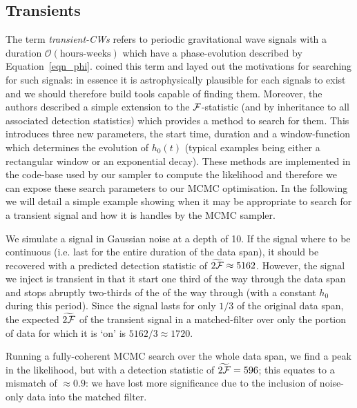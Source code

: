 \documentclass[aps, prd, twocolumn, superscriptaddress, floatfix, showpacs, nofootinbib, longbibliography]{revtex4-1}
\begin{document}
\subsection{Transients}
\label{sec_transients}

The term \emph{transient-CWs} refers to periodic gravitational wave signals
with a duration $\mathcal{O}(\textrm{hours-weeks})$ which have a
phase-evolution described by Equation~\eqref{eqn_phi}. \citet{prix2011} coined
this term and layed out the motivations for searching for such signals: in
essence it is astrophysically plausible for each signals to exist and we should
therefore build tools capable of finding them. Moreover, the authors described
a simple extension to the ${\mathcal{F}}$-statistic (and by inheritance to all associated
detection statistics) which provides a method to search for them. This
introduces three new parameters, the start time, duration and a window-function
which determines the evolution of $h_0(t)$ (typical examples being either a
rectangular window or an exponential decay). These methods are implemented in
the code-base used by our sampler to compute the likelihood and therefore we
can expose these search parameters to our MCMC optimisation. In the following
we will detail a simple example showing when it may be appropriate to search for
a transient signal and how it is handles by the MCMC sampler.

We simulate a signal in Gaussian noise at a depth of 10. If the signal where to
be continuous (i.e. last for the entire duration of the data span), it should
be recovered with a predicted detection statistic of
$\widetilde{2{\mathcal{F}}}\approx5162$. However, the signal we inject is transient in
that it start one third of the way through the data span and stops abruptly
two-thirds of the of the way through (with a constant $h_0$ during this
period). Since the signal lasts for only $1/3$ of the original data span, the
expected $\widetilde{2{\mathcal{F}}}$ of the transient signal in a matched-filter over only
the portion of data for which it is `on' is $5162/3\approx1720$.

Running a fully-coherent MCMC search over the whole data span, we find a peak
in the likelihood, but with a detection statistic of $\widetilde{2{\mathcal{F}}}=596$;
this equates to a mismatch of $\approx0.9$: we have lost more significance due
to the inclusion of noise-only data into the matched filter.
\end{document}
